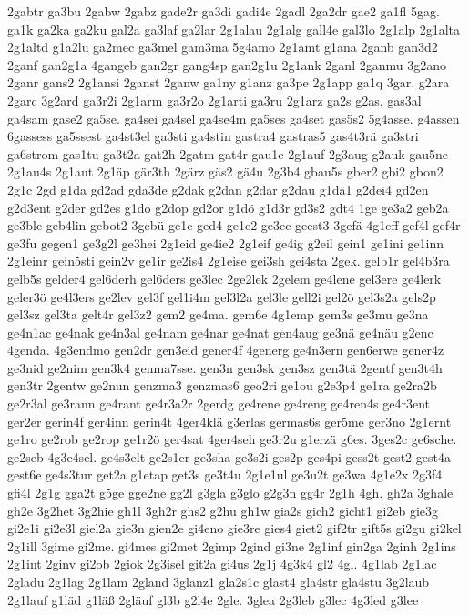 {2gabtr
ga3bu
2gabw
2gabz
gade2r
ga3di
gadi4e
2gadl
2ga2dr
gae2
ga1fl
5gag.
ga1k
ga2ka
ga2ku
gal2a
ga3laf
ga2lar
2g1alau
2g1alg
gall4e
gal3lo
2g1alp
2g1alta
2g1altd
g1a2lu
ga2mec
ga3mel
gam3ma
5g4amo
2g1amt
g1ana
2ganb
gan3d2
2ganf
gan2g1a
4gangeb
gan2gr
gang4sp
gan2g1u
2g1ank
2ganl
2ganmu
3g2ano
2ganr
gans2
2g1ansi
2ganst
2ganw
ga1ny
g1anz
ga3pe
2g1app
ga1q
3gar.
g2ara
2garc
3g2ard
ga3r2i
2g1arm
ga3r2o
2g1arti
ga3ru
2g1arz
ga2s
g2as.
gas3al
ga4sam
gase2
ga5se.
ga4sei
ga4sel
ga4se4m
ga5ses
ga4set
gas5s2
5g4asse.
g4assen
6gassess
ga5ssest
ga4st3el
ga3sti
ga4stin
gastra4
gastras5
gas4t3rä
ga3stri
ga6strom
gas1tu
ga3t2a
gat2h
2gatm
gat4r
gau1c
2g1auf
2g3aug
g2auk
gau5ne
2g1au4s
2g1aut
2g1äp
gär3th
2gärz
gäs2
gä4u
2g3b4
gbau5s
gber2
gbi2
gbon2
2g1c
2gd
g1da
gd2ad
gda3de
g2dak
g2dan
g2dar
g2dau
g1dä1
g2dei4
gd2en
g2d3ent
g2der
gd2es
g1do
g2dop
gd2or
g1dö
g1d3r
gd3s2
gdt4
1ge
ge3a2
geb2a
ge3ble
geb4lin
gebot2
3gebü
ge1c
ged4
ge1e2
ge3ec
geest3
3gefä
4g1eff
gef4l
gef4r
ge3fu
gegen1
ge3g2l
ge3hei
2g1eid
ge4ie2
2g1eif
ge4ig
g2eil
gein1
ge1ini
ge1inn
2g1einr
gein5sti
gein2v
ge1ir
ge2is4
2g1eise
gei3sh
gei4sta
2gek.
gelb1r
gel4b3ra
gelb5s
gelder4
gel6derh
gel6ders
ge3lec
2ge2lek
2gelem
ge4lene
gel3ere
ge4lerk
geler3ö
ge4l3ers
ge2lev
gel3f
gel1i4m
gel3l2a
gel3le
gell2i
gel2ö
gel3s2a
gels2p
gel3sz
gel3ta
gelt4r
gel3z2
gem2
ge4ma.
gem6e
4g1emp
gem3s
ge3mu
ge3na
ge4n1ac
ge4nak
ge4n3al
ge4nam
ge4nar
ge4nat
gen4aug
ge3nä
ge4näu
g2enc
4genda.
4g3endmo
gen2dr
gen3eid
gener4f
4generg
ge4n3ern
gen6erwe
gener4z
ge3nid
ge2nim
gen3k4
genma7sse.
gen3n
gen3sk
gen3sz
gen3tä
2gentf
gen3t4h
gen3tr
2gentw
ge2nun
genzma3
genzmas6
geo2ri
ge1ou
g2e3p4
ge1ra
ge2ra2b
ge2r3al
ge3rann
ge4rant
ge4r3a2r
2gerdg
ge4rene
ge4reng
ge4ren4s
ge4r3ent
ger2er
gerin4f
ger4inn
gerin4t
4ger4klä
g3erlas
germas6s
ger5me
ger3no
2g1ernt
ge1ro
ge2rob
ge2rop
ge1r2ö
ger4sat
4ger4seh
ge3r2u
g1erzä
g6es.
3ges2c
ge6sche.
ge2seb
4g3e4sel.
ge4s3elt
ge2s1er
ge3sha
ge3s2i
ges2p
ges4pi
gess2t
gest2
gest4a
gest6e
ge4s3tur
get2a
g1etap
get3s
ge3t4u
2g1e1ul
ge3u2t
ge3wa
4g1e2x
2g3f4
gfi4l
2g1g
gga2t
g5ge
gge2ne
gg2l
g3gla
g3glo
g2g3n
gg4r
2g1h
4gh.
gh2a
3ghale
gh2e
3g2het
3g2hie
gh1l
3gh2r
ghs2
g2hu
gh1w
gia2s
gich2
gicht1
gi2eb
gie3g
gi2e1i
gi2e3l
giel2a
gie3n
gien2e
gi4eno
gie3re
gies4
giet2
gif2tr
gift5s
gi2gu
gi2kel
2g1ill
3gime
gi2me.
gi4mes
gi2met
2gimp
2gind
gi3ne
2g1inf
gin2ga
2ginh
2g1ins
2g1int
2ginv
gi2ob
2giok
2g3isel
git2a
gi4us
2g1j
4g3k4
gl2
4gl.
4g1lab
2g1lac
2gladu
2g1lag
2g1lam
2gland
3glanz1
gla2s1c
glast4
gla4str
gla4stu
3g2laub
2g1lauf
g1läd
g1läß
2gläuf
gl3b
g2l4e
2gle.
3glea
2g3leb
g3lec
4g3led
g3lee
}
